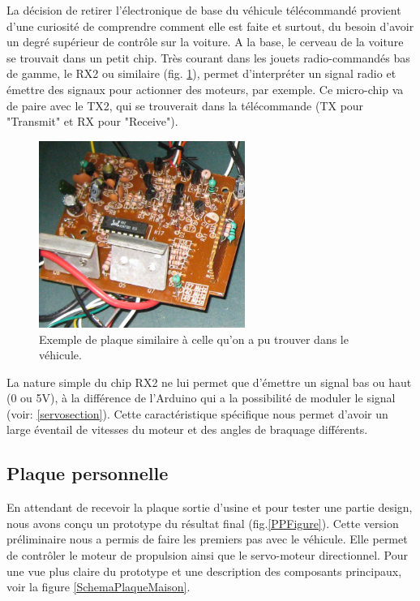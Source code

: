 \documentclass[a4paper,11pt]{report}
\begin{document}
{La décision de retirer l'électronique de base du véhicule télécommandé
provient d'une curiosité de comprendre comment elle est faite et surtout, du
besoin d'avoir un degré supérieur de contrôle sur la voiture. A la base, le
cerveau de la voiture se trouvait dans un petit chip. Très courant dans les
jouets radio-commandés bas de gamme, le RX2 ou similaire (fig. \ref{rx2.2}), permet d'interpréter
un signal radio et émettre des signaux pour actionner des moteurs, par
exemple. Ce micro-chip va de paire avec le TX2, qui se trouverait dans la
télécommande (TX pour "Transmit" et RX pour "Receive").


\begin{figure}[h]
\centering
\includegraphics[width=0.6\textwidth]{figures/rx2_ex2.jpg}
    \caption[Exemple de plaque RX2]{\label{rx2.2}Exemple de plaque similaire à celle qu'on a pu trouver
      dans le véhicule.}
\end{figure}

La nature simple du chip RX2 ne lui permet que d'émettre un signal bas ou haut
(0 ou 5V), à la différence de l'Arduino qui a la possibilité de moduler le
signal (voir: \ref{servosection}). Cette caractéristique spécifique nous permet
d'avoir un large éventail de vitesses du moteur et des angles de braquage
différents. 



\subsection{Plaque personnelle}
En attendant de recevoir la plaque sortie d'usine et pour tester une partie
design, nous avons conçu un prototype du résultat final
(fig.\ref{PPFigure}). Cette version préliminaire nous a permis de faire les
premiers
pas avec le véhicule. Elle permet de contrôler le moteur de propulsion ainsi
que le servo-moteur directionnel.
Pour une vue plus claire du prototype et une description des composants
principaux, voir la figure \ref{SchemaPlaqueMaison}. 

}
\end{document}
